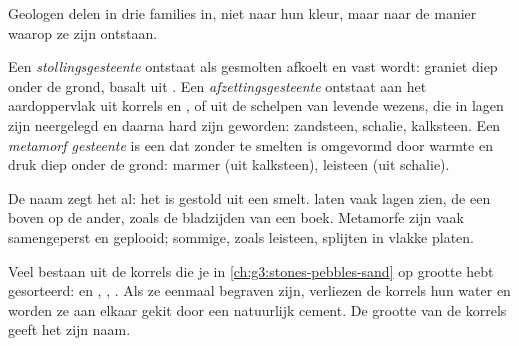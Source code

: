 Geologen delen  in drie families in, niet naar hun kleur, maar
naar de manier waarop ze zijn ontstaan.

\begin{definition}\label{def:g6:rocks-and-minerals:rock-families}
Een \emph{stollingsgesteente} ontstaat als
gesmolten  afkoelt en vast wordt: graniet diep onder de grond,
basalt uit . Een \emph{afzettingsgesteente}
ontstaat aan het aardoppervlak uit korrels  en , of uit de
schelpen van levende wezens, die in lagen zijn neergelegd en daarna hard
zijn geworden: zandsteen, schalie, kalksteen. Een \emph{metamorf
gesteente} is een  dat zonder te smelten
is omgevormd door warmte en druk diep onder de grond: marmer (uit
kalksteen), leisteen (uit schalie).
\end{definition}

De naam \emph{} zegt het al: het is gestold uit een
smelt.  laten vaak lagen zien, de een boven op de
ander, zoals de bladzijden van een boek. Metamorfe  zijn vaak
samengeperst en geplooid; sommige, zoals leisteen, splijten in vlakke
platen.

Veel  bestaan uit de korrels die je in
\cref{ch:g3:stones-pebbles-sand} op grootte hebt gesorteerd:  en
, , . Als ze eenmaal begraven zijn, verliezen de korrels hun
water en worden ze aan elkaar gekit door een natuurlijk cement. De grootte
van de korrels geeft het  zijn naam.

